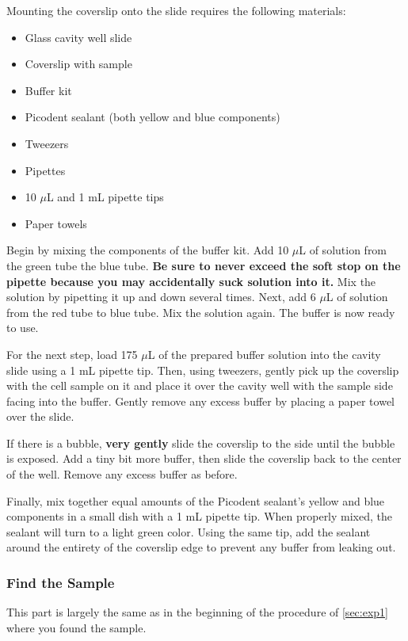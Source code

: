 \documentclass[10pt,a4paper,oneside]{book}
\begin{document}
Mounting the coverslip onto the slide requires the following materials:

\begin{itemize}
    \item{Glass cavity well slide}
    \item{Coverslip with sample}
    \item{Buffer kit}
    \item{Picodent sealant (both yellow and blue components)}
    \item{Tweezers}
    \item{Pipettes}
    \item{10 $\mu$L and 1 mL pipette tips}
    \item{Paper towels}
\end{itemize}

Begin by mixing the components of the buffer kit. Add 10 $\mu$L of solution from the green tube the blue tube. \textbf{Be sure to never exceed the soft stop on the pipette because you may accidentally suck solution into it.} Mix the solution by pipetting it up and down several times. Next, add 6 $\mu$L of solution from the red tube to blue tube. Mix the solution again. The buffer is now ready to use.

For the next step, load 175 $\mu$L of the prepared buffer solution into the cavity slide using a 1 mL pipette tip. Then, using tweezers, gently pick up the coverslip with the cell sample on it and place it over the cavity well with the sample side facing into the buffer. Gently remove any excess buffer by placing a paper towel over the slide.

If there is a bubble, \textbf{very gently} slide the coverslip to the side until the bubble is exposed. Add a tiny bit more buffer, then slide the coverslip back to the center of the well. Remove any excess buffer as before.

Finally, mix together equal amounts of the Picodent sealant's yellow and blue components in a small dish with a 1 mL pipette tip. When properly mixed, the sealant will turn to a light green color. Using the same tip, add the sealant around the entirety of the coverslip edge to prevent any buffer from leaking out.

\subsubsection{Find the Sample}

This part is largely the same as in the beginning of the procedure of \autoref{sec:exp1} where you found the sample.
\end{document}
